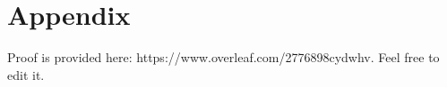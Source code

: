 \section{Appendix}

Proof is provided here: https://www.overleaf.com/2776898cydwhv. Feel free to edit it.